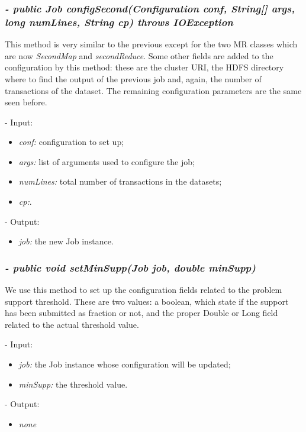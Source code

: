 \documentclass[]{report}
\begin{document}
	\subsubsection*{\textit{\textbf{-} public Job configSecond(Configuration conf, String[] args, long numLines, String cp) throws IOException }}   	
	This method is very similar to the previous except for the two MR classes which are now \textit{SecondMap} and \textit{secondReduce}. Some other fields are added to the configuration by this method: these are the cluster URI, the HDFS directory where to find the output of the previous job and, again, the number of transactions of the dataset. The remaining configuration parameters are the same seen before.  
	\begin{description}
		\item - Input:
		\begin{itemize}
			\item \textit{conf:} configuration to set up;
			\item \textit{args:} list of arguments used to configure the job;
			\item \textit{numLines:} total number of transactions in the datasets;
			\item \textit{cp:}.
		\end{itemize}
	\end{description}
	\begin{description}
		\item - Output:
		\begin{itemize}
			\item \textit{job:} the new Job instance. 
		\end{itemize}
	\end{description}

	\subsubsection*{\textit{\textbf{-} public void setMinSupp(Job job, double minSupp)}}   	
	We use this method to set up the configuration fields related to the problem support threshold. These are two values: a boolean, which state if the support has been submitted as fraction or not, and the proper Double or Long field related to the actual threshold value.    
	\begin{description}
		\item - Input:
		\begin{itemize}
			\item \textit{job:} the Job instance whose configuration will be updated;
			\item \textit{minSupp:} the threshold value.
		\end{itemize}
	\end{description}
	\begin{description}
		\item - Output:
		\begin{itemize}
			\item \textit{none} 
		\end{itemize}
	\end{description}
\end{document}
